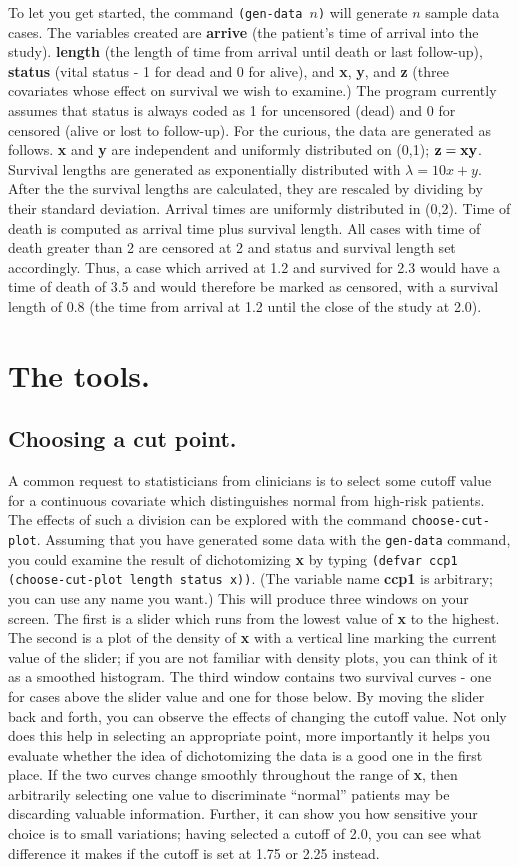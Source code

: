 \documentclass[11pt]{article}
\begin{document}
To let you get started, the command {\tt(gen-data $n$)} will generate $n$ sample
data cases. The variables created are {\bf arrive} (the patient's time of arrival into the
study). {\bf length} (the length of time from arrival until death
or last follow-up), {\bf status} (vital status - 1 for dead and 0 for alive), and
{\bf x}, {\bf y}, and {\bf z} (three covariates whose effect on survival we wish
to examine.) The program currently assumes that status is always coded as 1
for uncensored (dead) and 0 for censored (alive or lost to follow-up). For the curious,
the data are generated as follows. {\bf x} and {\bf y} are independent and
uniformly distributed on (0,1); ${\bf z}={\bf x}{\bf y}$. Survival lengths are
generated as exponentially distributed with $\lambda=10 x + y$. After the the survival
lengths are calculated, they are rescaled by dividing by their standard deviation.
Arrival times are uniformly distributed in (0,2). Time of death is computed as
arrival time plus survival length. All cases with time of death greater than 2 are
censored at 2 and status and survival length set accordingly. Thus, a case which
arrived at 1.2 and survived for 2.3 would have a time of death of 3.5 and would therefore
be marked as censored, with a survival length of 0.8 (the time from arrival at 1.2
until the close of the study at 2.0).
\section{The tools.}
\subsection{Choosing a cut point.}
A common request to statisticians from clinicians is to select some cutoff value for
a continuous covariate which distinguishes normal from high-risk patients. The effects
of such a division can be explored with the command {\tt choose-cut-plot}. Assuming
that you have generated some data with the {\tt gen-data} command, you could examine
the result of dichotomizing {\bf x} by typing 
{\tt(defvar ccp1 (choose-cut-plot length status x))}. (The variable name {\bf ccp1}
is arbitrary; you can use any name you want.) This will produce three windows on your
screen. The first is a slider which runs from the lowest value of {\bf x} to the
highest. The second is a plot of the density of {\bf x} with a vertical line marking
the current value of the slider; if you are not familiar with density plots, you can
think of it as a smoothed histogram. The third window contains two survival curves -
one for cases above the slider value and one for those below. By moving the slider
back and forth, you can observe the effects of changing the cutoff value. Not only
does this help in selecting an appropriate point, more importantly it helps you evaluate
whether the idea of dichotomizing the data is a good one in the first place. If the
two curves change smoothly throughout the range of {\bf x}, then arbitrarily selecting
one value to discriminate ``normal'' patients may be discarding valuable information.
Further, it can show you how sensitive your choice is to small variations; having
selected a cutoff of 2.0, you can see what difference it makes if the cutoff is set
at 1.75 or 2.25 instead.
\end{document}
